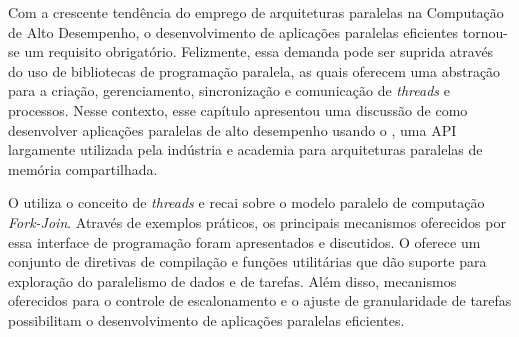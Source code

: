 \documentclass{SBCbookchapter}
\begin{document}
	Com a crescente tendência do emprego de arquiteturas paralelas na
	Computação de Alto Desempenho, o desenvolvimento de aplicações
	paralelas eficientes tornou-se um requisito obrigatório. Felizmente,
	essa demanda pode ser suprida através do uso de bibliotecas de
	programação paralela, as quais oferecem uma abstração para a
	criação, gerenciamento, sincronização e comunicação de
	\textit{threads} e processos. Nesse contexto, esse capítulo
	apresentou uma discussão de como desenvolver aplicações paralelas de
	alto desempenho usando o \openmp, uma API largamente utilizada pela
	indústria e academia para arquiteturas paralelas de memória
	compartilhada. 
	
	O \openmp utiliza o conceito de \textit{threads} e recai sobre o
	modelo paralelo de computação \textit{Fork-Join}.  Através
	de exemplos práticos, os principais mecanismos oferecidos por essa
	interface de programação foram apresentados e discutidos. O \openmp
	oferece um conjunto de diretivas de compilação e funções
	utilitárias que dão suporte para exploração do paralelismo
	de dados e de tarefas. Além disso, mecanismos
	oferecidos para o controle de escalonamento e o ajuste de
	granularidade de tarefas possibilitam o desenvolvimento de aplicações
	paralelas eficientes.


\end{document}
